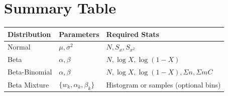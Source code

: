 \documentclass[11pt]{article}
\begin{document}
\section{Summary Table}
\begin{center}
\begin{tabular}{l l l}
\hline
\textbf{Distribution} & \textbf{Parameters} & \textbf{Required Stats} \\
\hline
Normal & $\mu, \sigma^2$ & $N, S_x, S_{x^2}$ \\
Beta & $\alpha, \beta$ & $N, \log X, \log(1-X)$ \\
Beta-Binomial & $\alpha, \beta$ & $N, \log X, \log(1-X), \Sigma n, \Sigma mC$ \\
Beta Mixture & $\{w_k,\alpha_k,\beta_k\}$ & Histogram or samples (optional bins) \\
\hline
\end{tabular}
\end{center}
\end{document}
